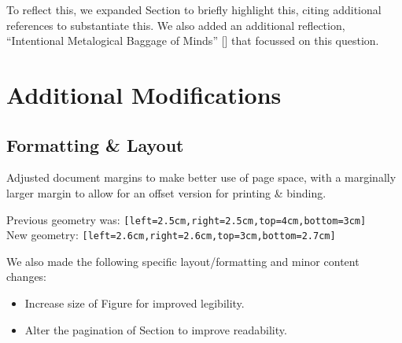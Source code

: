 \documentclass[hidelinks,a4paper,11pt,openany]{article}
\begin{document}
To reflect this, we expanded Section  to briefly highlight this, citing additional references to substantiate this.  We also added an additional reflection, ``Intentional Metalogical Baggage of Minds'' [] that focussed on this question.



\clearpage


\section{Additional Modifications}
\label{sec:additional-mods}


\subsection{Formatting \& Layout}
\label{subsec:additional-mods.format}

Adjusted document margins to make better use of page space, with a marginally larger margin to allow for an offset version for printing \& binding.

Previous geometry was: \texttt{[left=2.5cm,right=2.5cm,top=4cm,bottom=3cm]}\\
New geometry: \texttt{[left=2.6cm,right=2.6cm,top=3cm,bottom=2.7cm]}

We also made the following specific layout/formatting and minor content changes:

\begin{itemize}
	\item Increase size of Figure  for improved legibility.
	\item Alter the pagination of Section  to improve readability.
\end{itemize}
\end{document}
